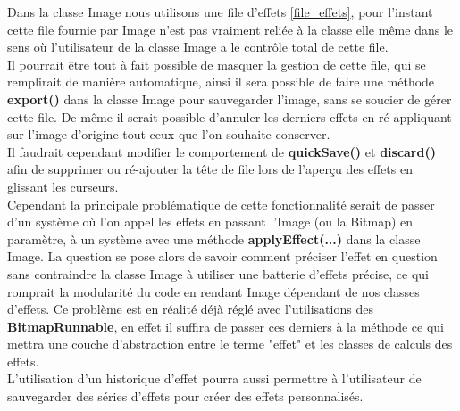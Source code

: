Dans la classe Image nous utilisons une file d'effets \ref{file_effets}, pour l'instant cette file fournie par Image n'est pas vraiment reliée à la classe elle même dans le sens où l'utilisateur de la classe Image a le contrôle total de cette file.
\\
Il pourrait être tout à fait possible de masquer la gestion de cette file, qui se remplirait de manière automatique, ainsi il sera possible de faire une méthode \textbf{export()} dans la classe Image pour sauvegarder l'image, sans se soucier de gérer cette file. De même il serait possible d'annuler les derniers effets en ré appliquant sur l'image d'origine tout ceux que l'on souhaite conserver.
\\
Il faudrait cependant modifier le comportement de \textbf{quickSave()} et \textbf{discard()} afin de supprimer ou ré-ajouter la tête de file lors de l'aperçu des effets en glissant les curseurs.
\\
Cependant la principale problématique de cette fonctionnalité serait de passer d'un système où l'on appel les effets en passant l'Image (ou la Bitmap) en paramètre, à un système avec une méthode \textbf{applyEffect(...)} dans la classe Image. La question se pose alors de savoir comment préciser l'effet en question sans contraindre la classe Image à utiliser une batterie d'effets précise, ce qui romprait la modularité du code en rendant Image dépendant de nos classes d'effets. Ce problème est en réalité déjà réglé avec l'utilisations des \textbf{BitmapRunnable}, en effet il suffira de passer ces derniers à la méthode ce qui mettra une couche d'abstraction entre le terme "effet" et les classes de calculs des effets.
\\

L'utilisation d'un historique d'effet pourra aussi permettre à l'utilisateur de sauvegarder des séries d'effets pour créer des effets personnalisés.
\\